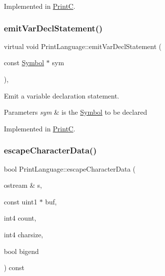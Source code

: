 Implemented in \mbox{\hyperlink{class_print_c_ae05bed1958ac3b694bdeda2897e6a1ff}{PrintC}}.

\mbox{\label{class_print_language_ab8d65e75ede43bc2f14b926bba89d7ae}} 
\subsubsection{\texorpdfstring{emitVarDeclStatement()}{emitVarDeclStatement()}}
{\footnotesize\ttfamily virtual void Print\+Language\+::emit\+Var\+Decl\+Statement (\begin{DoxyParamCaption}\item[{const \mbox{\hyperlink{class_symbol}{Symbol}} $\ast$}]{sym }\end{DoxyParamCaption})\hspace{0.3cm}{\ttfamily [protected]}, {}}



Emit a variable declaration statement. 


\begin{DoxyParams}{Parameters}
{\em sym} & is the \mbox{\hyperlink{class_symbol}{Symbol}} to be declared \\
\hline
\end{DoxyParams}


Implemented in \mbox{\hyperlink{class_print_c_a56fd9b353cd343909b2700fe42875885}{PrintC}}.

\mbox{\label{class_print_language_a846d6e68f8bbdde7cf6a442d2ce5fc16}} 
\subsubsection{\texorpdfstring{escapeCharacterData()}{escapeCharacterData()}}
{\footnotesize\ttfamily bool Print\+Language\+::escape\+Character\+Data (\begin{DoxyParamCaption}\item[{ostream \&}]{s,  }\item[{const uint1 $\ast$}]{buf,  }\item[{int4}]{count,  }\item[{int4}]{charsize,  }\item[{bool}]{bigend }\end{DoxyParamCaption}) const\hspace{0.3cm}{\ttfamily [protected]}}



